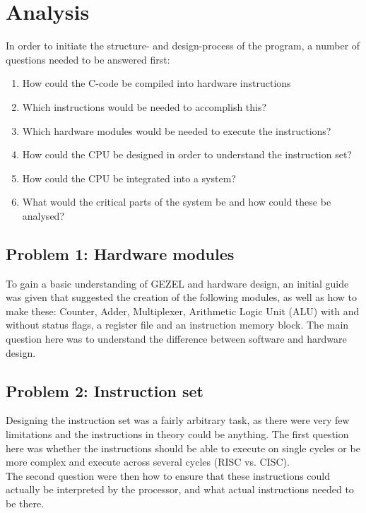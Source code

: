 \documentclass[12pt,a4paper]{article}
\begin{document}
\section{Analysis}
 	In order to initiate the structure- and design-process of the program, a number of questions needed to be answered first:\\
 	
 	\begin{enumerate}
	\item How could the C-code be compiled into hardware instructions
	\item Which instructions would be needed to accomplish this?
	\item Which hardware modules would be needed to execute the instructions?	
	\item How could the CPU be designed in order to understand the instruction set?
	\item How could the CPU be integrated into a system?
	\item What would the critical parts of the system be and how could these be analysed?
\end{enumerate}

\subsection{Problem 1: Hardware modules}
	To gain a basic understanding of GEZEL and hardware design, an initial guide was given that suggested the creation of the following modules, as well as how to make these: Counter, Adder, Multiplexer, Arithmetic Logic Unit (ALU) with and without status flags, a register file and an instruction memory block. The main question here was to understand the difference between software and hardware design.\\
	
\subsection{Problem 2: Instruction set}
	Designing the instruction set was a fairly arbitrary task, as there were very few limitations and the instructions in theory could be anything. The first question here was whether the instructions should be able to execute on single cycles or be more complex and execute across several cycles (RISC vs. CISC).\\
	The second question were then how to ensure that these instructions could actually be interpreted by the processor, and what actual instructions needed to be there.\\
	\\
	
\end{document}
